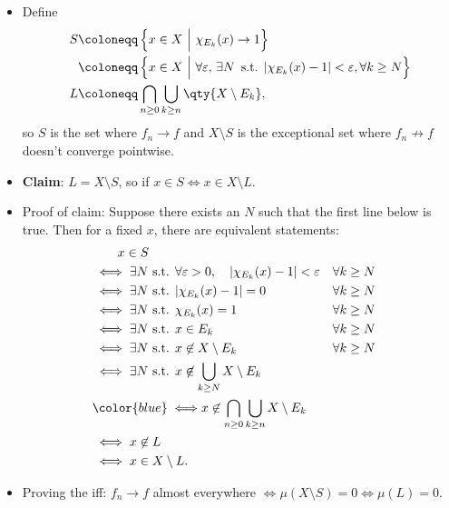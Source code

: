 \begin{solution}
\begin{itemize}
\item
  Define
  \begin{align*}
  S &\coloneqq\left\{{x\in X {~\mathrel{\Big|}~}\chi_{E_k}(x) \to 1}\right\}\\
  &\coloneqq\left\{{x\in X {~\mathrel{\Big|}~}\forall {\varepsilon},\, \exists N\, \text{ s.t. } {\left\lvert {\chi_{E_k}(x) - 1 } \right\rvert} < {\varepsilon},\forall k\geq N}\right\}\\
  L &\coloneqq\displaystyle\bigcap_{n\geq 0} \displaystyle\bigcup_{k\geq n} \qty{X\setminus E_k}
  ,\end{align*}
  so \(S\) is the set where \(f_n\to f\) and \(X\setminus S\) is the
  exceptional set where \(f_n\not\to f\) doesn't converge pointwise.
\item
  \textbf{Claim}: \(L = X\setminus S\), so if
  \(x\in S \iff x\in X\setminus L\).
\item
  Proof of claim: Suppose there exists an \(N\) such that the first line
  below is true. Then for a fixed \(x\), there are equivalent
  statements:
  \begin{align*}
  &\qquad x \in S \\
  &\iff \exists N \text{ s.t. } \forall {\varepsilon}>0,\quad {\left\lvert {\chi_{E_k}(x) - 1 } \right\rvert} < {\varepsilon}&& \forall k\geq N \\ 
  &\iff 
  \exists N \text{ s.t. } 
  {\left\lvert {\chi_{E_k}(x) - 1 } \right\rvert} = 0 && \forall k\geq N \\ 
  &\iff 
  \exists N \text{ s.t. } 
  \chi_{E_k}(x) = 1 && \forall k\geq N \\
  &\iff 
  \exists N \text{ s.t. } 
  x\in E_k && \forall k\geq N \\
  &\iff 
  \exists N \text{ s.t. } 
  x\not\in X\setminus E_k &&\forall k\geq N \\
  &\iff 
  \exists N \text{ s.t. } 
  x\not\in \displaystyle\bigcup_{k\geq N} X\setminus E_k  \\
  &{\color{blue} \iff} 
  x\not\in \displaystyle\bigcap_{n\geq 0}\displaystyle\bigcup_{k\geq n} X\setminus E_k \\
  &\iff x\not\in L \\
  &\iff x\in X\setminus L
  .\end{align*}
\item
  Proving the iff: \(f_n\to f\) almost everywhere
  \(\iff \mu(X\setminus S) = 0 \iff \mu(L) = 0\).
\end{itemize}

\end{solution}

